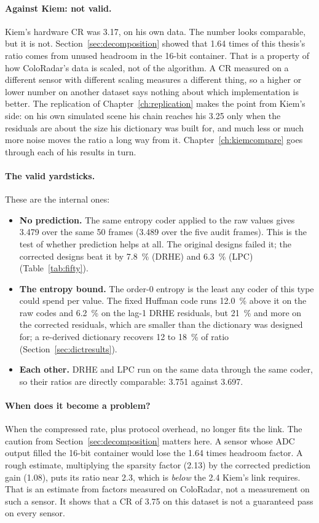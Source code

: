 \paragraph{Against Kiem: not valid.} Kiem's hardware CR was 3.17, on his own
data. The number looks comparable, but it is not. Section~\ref{sec:decomposition}
showed that 1.64 times of this thesis's ratio comes from unused headroom in the
16-bit container. That is a property of how ColoRadar's data is scaled, not of
the algorithm. A CR measured on a different sensor with different scaling
measures a different thing, so a higher or lower number on another dataset says
nothing about which implementation is better. The replication of
Chapter~\ref{ch:replication} makes the point from Kiem's side: on his own
simulated scene his chain reaches his 3.25 only when the residuals are about
the size his dictionary was built for, and much less or much more noise moves
the ratio a long way from it. Chapter~\ref{ch:kiemcompare} goes through each of
his results in turn.

\paragraph{The valid yardsticks.} These are the internal ones:
\begin{itemize}
\item \textbf{No prediction.} The same entropy coder applied to the raw values
gives 3.479 over the same 50 frames (3.489 over the five audit frames). This
is the test of whether prediction helps at all. The original designs failed it;
the corrected designs beat it by \SI{7.8}{\percent} (DRHE) and
\SI{6.3}{\percent} (LPC) (Table~\ref{tab:fifty}).
\item \textbf{The entropy bound.} The order-0 entropy is the least any coder
of this type could spend per value. The fixed Huffman code runs
\SI{12.0}{\percent} above it on the raw codes and \SI{6.2}{\percent} on the
lag-1 DRHE residuals, but \SI{21}{\percent} and more on the corrected
residuals, which are smaller than the dictionary was designed for; a
re-derived dictionary recovers 12 to \SI{18}{\percent} of ratio
(Section~\ref{sec:dictresults}).
\item \textbf{Each other.} DRHE and LPC run on the same data through the same
coder, so their ratios are directly comparable: 3.751 against 3.697.
\end{itemize}

\paragraph{When does it become a problem?} When the compressed rate, plus
protocol overhead, no longer fits the link. The caution from
Section~\ref{sec:decomposition} matters here. A sensor whose ADC output filled
the 16-bit container would lose the 1.64 times headroom factor. A rough
estimate, multiplying the sparsity factor (2.13) by the corrected prediction
gain (1.08), puts its ratio near 2.3, which is \emph{below} the 2.4 Kiem's link
requires. That is an estimate from factors measured on ColoRadar, not a
measurement on such a sensor. It shows that a CR of 3.75 on this dataset is not
a guaranteed pass on every sensor.



